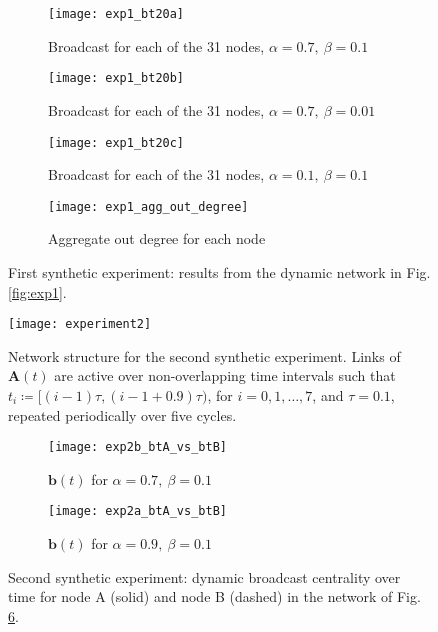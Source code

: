 \begin{figure}[htp!]
     \centering
     \begin{subfigure}[b]{0.49\textwidth}
         \centering
         \texttt{[image: exp1\_bt20a]}
         \caption{Broadcast for each of the 31 nodes, $\alpha = 0.7 ,~\beta = 0.1$}
         \label{fig:bt1}
     \end{subfigure}
     \begin{subfigure}[b]{0.49\textwidth}
         \centering
         \texttt{[image: exp1\_bt20b]}
         \caption{Broadcast for each of the 31 nodes, $\alpha = 0.7 ,~\beta = 0.01$}
         \label{fig:bt2}
     \end{subfigure}
     
     \begin{subfigure}[b]{0.49\textwidth}
         \centering
         \texttt{[image: exp1\_bt20c]}
         \caption{Broadcast for each of the 31 nodes, $\alpha = 0.1 ,~\beta = 0.1$}
         \label{fig:bt3}
     \end{subfigure}
     \begin{subfigure}[b]{0.49\textwidth}
         \centering
         \texttt{[image: exp1\_agg\_out\_degree]}
         \caption{Aggregate out degree for each node}
         \label{fig:bt4}
     \end{subfigure}
        \caption{First synthetic experiment: results from the dynamic network in Fig. \ref{fig:exp1}.}
        \label{fig:fourbt}
\end{figure}

\begin{figure}[h]\centering
    \texttt{[image: experiment2]}
    \caption{Network structure for the second synthetic experiment. Links of $\mathbf{A}(t)$ are active over non-overlapping time intervals such that $t_i\coloneqq[(i − 1)\tau , (i − 1 + 0.9)\tau )$, for $i=0, 1, \dots , 7$, and $\tau =0.1$, repeated periodically over five cycles.}
    \label{fig:exp2}
    \bigskip
\end{figure}

\begin{figure}
     \centering
     \begin{subfigure}[b]{0.49\textwidth}
         \centering
         \texttt{[image: exp2b\_btA\_vs\_btB]}
         \caption{$\mathbf{b}(t)$ for $\alpha = 0.7 ,~\beta = 0.1$}
         \label{fig:bt5}
     \end{subfigure}
     \hfill
     \begin{subfigure}[b]{0.49\textwidth}
         \centering
         \texttt{[image: exp2a\_btA\_vs\_btB]}
         \caption{$\mathbf{b}(t)$ for $\alpha = 0.9 ,~\beta = 0.1$}
         \label{fig:bt6}
     \end{subfigure}
     \caption{Second synthetic experiment: dynamic broadcast centrality over time for node A (solid) and node B (dashed) in the network of Fig. \ref{fig:exp2}.}
     \label{fig:twobt}
\end{figure}

